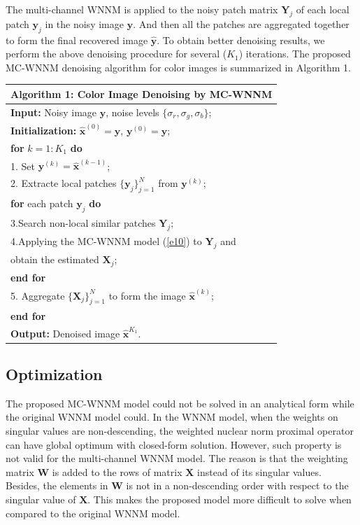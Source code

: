 \documentclass[10pt,twocolumn,letterpaper,sort&compress]{article}
\begin{document}
The multi-channel WNNM is applied to the noisy patch matrix $\mathbf{Y}_{j}$ of each local patch $\mathbf{y}_{j}$ in the noisy image $\mathbf{y}$. And then all the patches are aggregated together to form the final recovered image $\hat{\mathbf{y}}$. To obtain better denoising results, we perform the above denoising procedure for several ($K_{1}$) iterations. The proposed MC-WNNM denoising algorithm for color images is summarized in Algorithm 1.
\begin{table}
\begin{tabular}{l}
\hline
\textbf{Algorithm 1}: Color Image Denoising by MC-WNNM
\\
\hline
\textbf{Input:} Noisy image $\mathbf{y}$, noise levels $\{\sigma_{r}, \sigma_{g}, \sigma_{b}\}$;
\\
\textbf{Initialization:} $\hat{\mathbf{x}}^{(0)}=\mathbf{y}$, $\mathbf{y}^{(0)}=\mathbf{y}$;
\\
\textbf{for} $k = 1:K_{1}$ \textbf{do}
\\
1. Set $\mathbf{y}^{(k)}=\hat{\mathbf{x}}^{(k-1)}$;
\\
2. Extracte local patches $\{\mathbf{y}_{j}\}_{j=1}^{N}$ from $\mathbf{y}^{(k)}$;
\\
\quad\textbf{for} each patch $\mathbf{y}_{j}$ \textbf{do}
\\
3.\quad Search non-local similar patches $\mathbf{Y}_{j}$;
\\
4.\quad Applying the MC-WNNM model (\ref{e10}) to $\mathbf{Y}_{j}$ and
\\
\quad \quad 
obtain the estimated $\mathbf{X}_{j}$;
\\
\quad\textbf{end for}
\\
5. Aggregate $\{\mathbf{X}_{j}\}_{j=1}^{N}$ to form the image $\hat{\mathbf{x}}^{(k)}$;
\\
\textbf{end for}
\\
\textbf{Output:} Denoised image $\hat{\mathbf{x}}^{K_{1}}$.
\\
\hline
\end{tabular}
\vspace{-1mm}
\label{a1}
\end{table}


\subsection{Optimization}
The proposed MC-WNNM model could not be solved in an analytical form while the original WNNM model \cite{wnnmijcv} could. In the WNNM model, when the weights on singular values are non-descending, the weighted nuclear norm proximal operator \cite{wnnmijcv} can have global optimum with closed-form solution. However, such property is not valid for the multi-channel WNNM model. The reason is that the weighting matrix $\mathbf{W}$ is added to the rows of matrix $\mathbf{X}$ instead of its singular values. Besides, the elements in $\mathbf{W}$ is not in a non-descending order with respect to the singular value of $\mathbf{X}$. This makes the proposed model more difficult to solve when compared to the original WNNM model.
\end{document}

